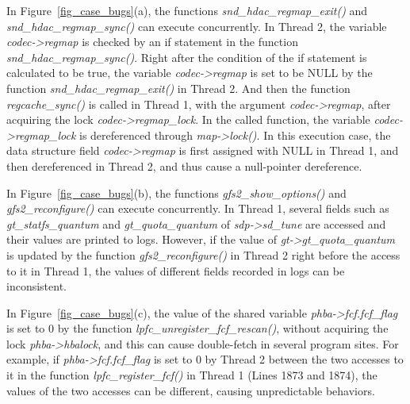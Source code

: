  In 
Figure~\ref{fig_case_bugs}(a), the functions {\em snd\_hdac\_regmap\_exit()} 
and {\em snd\_hdac\_regmap\_sync()} can execute concurrently. In Thread 2, the 
variable {\em codec->regmap} is checked by an if statement in the function {\em 
snd\_hdac\_regmap\_sync()}. Right after the condition of the if statement is 
calculated to be true, the variable {\em codec->regmap} is set to be NULL by 
the function {\em snd\_hdac\_regmap\_exit()} in Thread 2. And then the function 
{\em regcache\_sync()} is called in Thread 1, with the argument {\em 
codec->regmap}, after acquiring the lock {\em codec->regmap\_lock}. In the 
called function, the variable {\em codec->regmap\_lock} is dereferenced through 
{\em map->lock()}. In this execution case, the data structure field {\em 
codec->regmap} is first assigned with NULL in Thread 1, and then dereferenced 
in Thread 2, and thus cause a null-pointer dereference.

 In 
Figure~\ref{fig_case_bugs}(b), the functions {\em gfs2\_show\_options()} and 
{\em gfs2\_reconfigure()} can execute concurrently. In Thread 1, several fields 
such as {\em gt\_statfs\_quantum} and {\em gt\_quota\_quantum} of {\em 
sdp->sd\_tune} are accessed and their values are printed to logs. However, if 
the value of {\em gt->gt\_quota\_quantum} is updated by the function {\em 
gfs2\_reconfigure()} in Thread 2 right before the access to it in Thread 1, the 
values of different fields recorded in logs can be inconsistent.

 In 
Figure~\ref{fig_case_bugs}(c), the value of the shared variable {\em 
phba->fcf.fcf\_flag} is set to 0 by the function {\em 
lpfc\_unregister\_fcf\_rescan()}, without acquiring the lock {\em 
phba->hbalock}, and this can cause double-fetch in several program sites. For 
example, if {\em phba->fcf.fcf\_flag} is set to 0 by Thread 2 between the two 
accesses to it in the function {\em lpfc\_register\_fcf()} in Thread 1 (Lines 
1873 and 1874), the values of the two accesses can be different, causing 
unpredictable behaviors.

